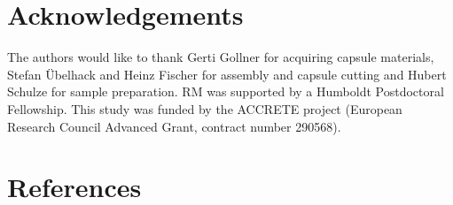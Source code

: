 \documentclass[review]{elsarticle}
\begin{document}
\section{Acknowledgements}
The authors would like to thank Gerti Gollner for acquiring capsule materials, Stefan \"Ubelhack and Heinz Fischer for assembly and capsule cutting and Hubert Schulze for sample preparation. RM was supported by a Humboldt Postdoctoral Fellowship. This study was funded by the ACCRETE project (European Research Council Advanced Grant, contract number 290568).

\clearpage
\section*{References}


\end{document}

